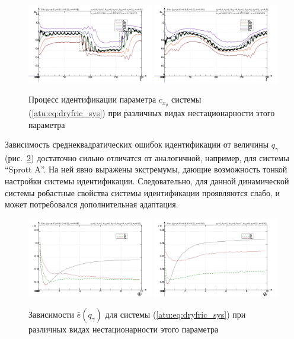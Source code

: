 \begin{figure}[htb!]
\centerline{
  \includegraphics[width=0.49\textwidth]{p/cha/fric/fric_m5p-pl_n_sign.png}
  \includegraphics[width=0.49\textwidth]{p/cha/fric/fric_m5p-pl_n_sin.png}
}
\caption{Процесс идентификации параметра $c_{x_y} $ системы (\ref{atu:eq:dryfric_sys})
  при различных видах нестационарности этого параметра
}
\label{atu:f:fric_id}
\end{figure}

Зависимость среднеквадратических ошибок идентификации от величины $q_\gamma$ (рис.~\ref{atu:f:fric_e_qgamma})
достаточно сильно отличатся от аналогичной, например, для системы ``Sprott A''. На ней явно выражены
экстремумы, дающие возможность тонкой настройки системы идентификации. Следовательно,
для данной динамической системы робастные свойства системы идентификации проявляются слабо,
и может потребовался дополнительная адаптация.

\begin{figure}[htb!]
\centerline{
  \includegraphics[width=0.49\textwidth]{p/cha/fric/fric_m5p-p_qg_e_sign.png}
  \includegraphics[width=0.49\textwidth]{p/cha/fric/fric_m5p-p_qg_e_sin.png}
}
  \caption{Зависимости  $\bar{e}(q_\gamma)$ для системы (\ref{atu:eq:dryfric_sys})
  при различных видах нестационарности этого параметра
}
\label{atu:f:fric_e_qgamma}
\end{figure}


